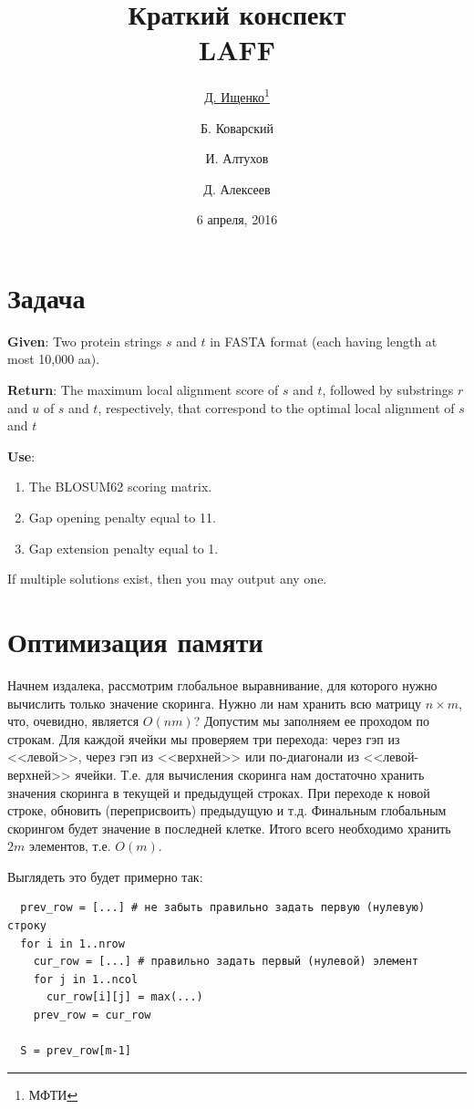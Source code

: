 \documentclass[letterpaper, 11pt]{article}
\title{\large{Краткий конспект}\\
\LARGE{LAFF}}
\date{6 апреля, 2016}
\author{\underline{Д. Ищенко\thanks{МФТИ}} \and Б. Коварский\footnotemark[1]
\and И. Алтухов\footnotemark[1] \and Д. Алексеев\footnotemark[1]}
\begin{document}
\maketitle
\thispagestyle{empty}
\clearpage

\section{Задача}

\textbf{Given}: Two protein strings $s$ and $t$ in FASTA format (each having length at most 10,000 aa).

\textbf{Return}: The maximum local alignment score of $s$ and $t$, followed by substrings $r$ and $u$ of $s$ and $t$, respectively, that correspond to the optimal local alignment of $s$ and $t$

\textbf{Use}:
\begin{enumerate}
\item
The BLOSUM62 scoring matrix.
\item
Gap opening penalty equal to 11.
\item
Gap extension penalty equal to 1.
\end{enumerate}

If multiple solutions exist, then you may output any one.

\section{Оптимизация памяти}
Начнем издалека, рассмотрим глобальное выравнивание, для которого нужно вычислить только значение скоринга. Нужно ли нам хранить всю матрицу $n \times m$, что, очевидно, является $O(nm)$? Допустим мы заполняем ее проходом по строкам. Для каждой ячейки мы проверяем три перехода: через гэп из <<левой>>, через гэп из <<верхней>> или по-диагонали из <<левой-верхней>> ячейки. Т.е. для вычисления скоринга нам достаточно хранить значения скоринга в текущей и предыдущей строках. При переходе к новой строке, обновить (переприсвоить) предыдущую и т.д. Финальным глобальным скорингом будет значение в последней клетке. Итого всего необходимо хранить $2m$ элементов, т.е. $O(m)$.

Выглядеть это будет примерно так:
\begin{verbatim}
  prev_row = [...] # не забыть правильно задать первую (нулевую) строку
  for i in 1..nrow
    cur_row = [...] # правильно задать первый (нулевой) элемент
    for j in 1..ncol
      cur_row[i][j] = max(...)
    prev_row = cur_row
  
  S = prev_row[m-1]
\end{verbatim}
\end{document}
